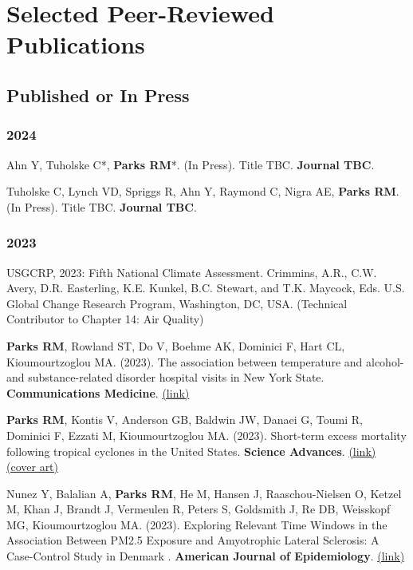 \section*{Selected Peer-Reviewed Publications}

\subsection*{Published or In Press}

\subsubsection*{2024}

\noindent Ahn Y, Tuholske C*, \textbf{Parks RM}*. (In Press). Title TBC. \textbf{Journal TBC}.\smallskip 

\noindent Tuholske C, Lynch VD, Spriggs R, Ahn Y, Raymond C, Nigra AE, \textbf{Parks RM}. (In Press). Title TBC. \textbf{Journal TBC}.

\subsubsection*{2023}

USGCRP, 2023: Fifth National Climate Assessment. Crimmins, A.R., C.W. Avery, D.R. Easterling, K.E. Kunkel, B.C. Stewart, and T.K. Maycock, Eds. U.S. Global Change Research Program, Washington, DC, USA. (Technical Contributor to Chapter 14: Air Quality) \smallskip

\noindent \textbf{Parks RM}, Rowland ST, Do V, Boehme AK, Dominici F, Hart CL, Kioumourtzoglou MA. (2023). The association between temperature and alcohol- and substance-related disorder hospital visits in New York State. \textbf{Communications Medicine}. \href{https://www.nature.com/articles/s43856-023-00346-1}{(link)}\smallskip

\noindent \textbf{Parks RM}, Kontis V, Anderson GB, Baldwin JW, Danaei G, Toumi R, Dominici F, Ezzati M, Kioumourtzoglou MA. (2023). Short-term excess mortality following tropical cyclones in the United States. \textbf{Science Advances}. \href{https://www.science.org/doi/10.1126/sciadv.adg6633}{(link)} \href{https://www.science.org/toc/sciadv/9/33}{(cover art)}\smallskip

\noindent Nunez Y, Balalian A, \textbf{Parks RM}, He M, Hansen J, Raaschou-Nielsen O, Ketzel M, Khan J, Brandt J, Vermeulen R, Peters S, Goldsmith J, Re DB, Weisskopf MG, Kioumourtzoglou MA. (2023). Exploring Relevant Time Windows in the Association Between PM2.5 Exposure and Amyotrophic Lateral Sclerosis: A Case-Control Study in Denmark . \textbf{American Journal of Epidemiology}. \href{https://academic.oup.com/aje/advance-article-abstract/doi/10.1093/aje/kwad099/7135818?redirectedFrom=fulltext&login=false}{(link)}\smallskip

